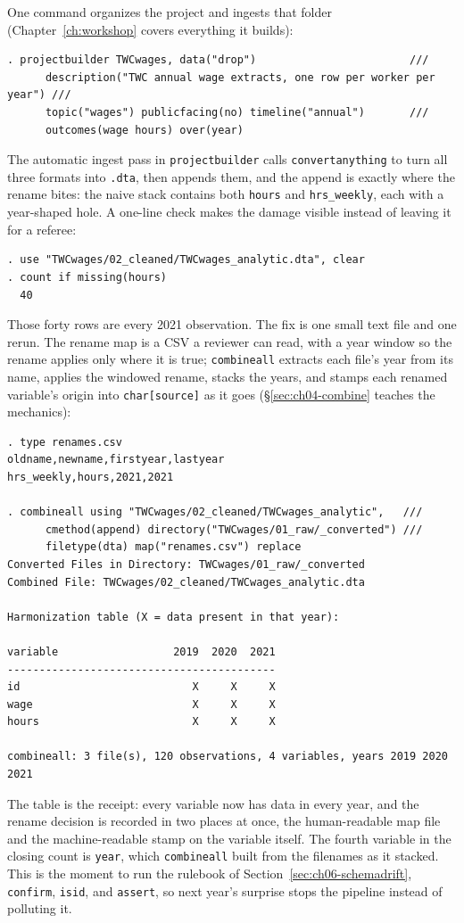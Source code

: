 One command organizes the project and ingests that folder (Chapter~\ref{ch:workshop} covers everything it builds):
\par
{\footnotesize
\begin{verbatim}
. projectbuilder TWCwages, data("drop")                        ///
      description("TWC annual wage extracts, one row per worker per year") ///
      topic("wages") publicfacing(no) timeline("annual")       ///
      outcomes(wage hours) over(year)
\end{verbatim}
}
The automatic ingest pass in \texttt{projectbuilder} calls \texttt{convertanything} to turn all three formats into \texttt{.dta}, then appends them, and the append is exactly where the rename bites: the naive stack contains both \texttt{hours} and \texttt{hrs\_weekly}, each with a year-shaped hole. A one-line check makes the damage visible instead of leaving it for a referee:
\par
{\footnotesize
\begin{verbatim}
. use "TWCwages/02_cleaned/TWCwages_analytic.dta", clear
. count if missing(hours)
  40
\end{verbatim}
}
Those forty rows are every 2021 observation. The fix is one small text file and one rerun. The rename map is a CSV a reviewer can read, with a year window so the rename applies only where it is true; \texttt{combineall} extracts each file's year from its name, applies the windowed rename, stacks the years, and stamps each renamed variable's origin into \texttt{char[source]} as it goes (\S\ref{sec:ch04-combine} teaches the mechanics):
\par
{\footnotesize
\begin{verbatim}
. type renames.csv
oldname,newname,firstyear,lastyear
hrs_weekly,hours,2021,2021

. combineall using "TWCwages/02_cleaned/TWCwages_analytic",   ///
      cmethod(append) directory("TWCwages/01_raw/_converted") ///
      filetype(dta) map("renames.csv") replace
Converted Files in Directory: TWCwages/01_raw/_converted
Combined File: TWCwages/02_cleaned/TWCwages_analytic.dta

Harmonization table (X = data present in that year):

variable                  2019  2020  2021
------------------------------------------
id                           X     X     X
wage                         X     X     X
hours                        X     X     X

combineall: 3 file(s), 120 observations, 4 variables, years 2019 2020 2021
\end{verbatim}
}
The table is the receipt: every variable now has data in every year, and the rename decision is recorded in two places at once, the human-readable map file and the machine-readable stamp on the variable itself. The fourth variable in the closing count is \texttt{year}, which \texttt{combineall} built from the filenames as it stacked. This is the moment to run the rulebook of Section~\ref{sec:ch06-schemadrift}, \texttt{confirm}, \texttt{isid}, and \texttt{assert}, so next year's surprise stops the pipeline instead of polluting it.

